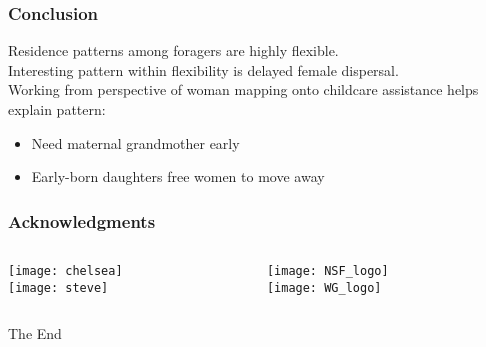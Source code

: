 \documentclass{beamer}
\begin{document}



\begin{frame}
\frametitle{Conclusion}
Residence patterns among foragers are highly flexible. \\
\vspace{0.5cm}
Interesting pattern within flexibility is delayed female dispersal. \\
\vspace{0.5cm}
Working from perspective of woman mapping onto childcare assistance helps explain pattern:
\begin{itemize}
\item Need maternal grandmother early
\item Early-born daughters free women to move away
\end{itemize}
\end{frame}


\begin{frame}
\frametitle{Acknowledgments}

\begin{columns}
\begin{column}{.8\textwidth}
\centering
\texttt{[image: chelsea]}\\
\texttt{[image: steve]}
\end{column}

\begin{column}{.2\textwidth}
\texttt{[image: NSF\_logo]}\\
\texttt{[image: WG\_logo]}
\end{column}
\end{columns}

\end{frame}


\begin{frame}
\Huge{\centerline{The End}}
\end{frame}

\end{document}
